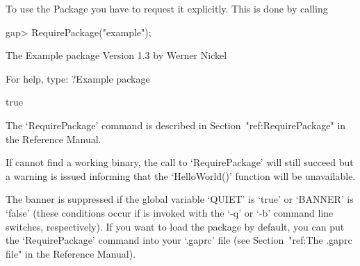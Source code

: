 To use the {\Example} Package you have to request it explicitly. This  is
done by calling

\beginexample
gap> RequirePackage("example");

           The Example package
               Version 1.3    
            by Werner Nickel 

     For help, type: ?Example package

true
\endexample

The `RequirePackage' command is described in Section~"ref:RequirePackage"
in the {\GAP} Reference Manual.

If {\GAP} cannot find a working binary, the call to `RequirePackage' will
still succeed but a warning is issued informing that  the  `HelloWorld()'
function will be unavailable.

The banner is suppressed if the global {\GAP} variable `QUIET' is  `true'
or `BANNER' is `false' (these conditions occur if {\GAP} is invoked  with
the `-q' or `-b' command line switches, respectively).  If  you  want  to
load the {\Example} package by default, you can put the  `RequirePackage'
command into your `.gaprc' file (see Section~"ref:The .gaprc file" in the
{\GAP} Reference Manual).

